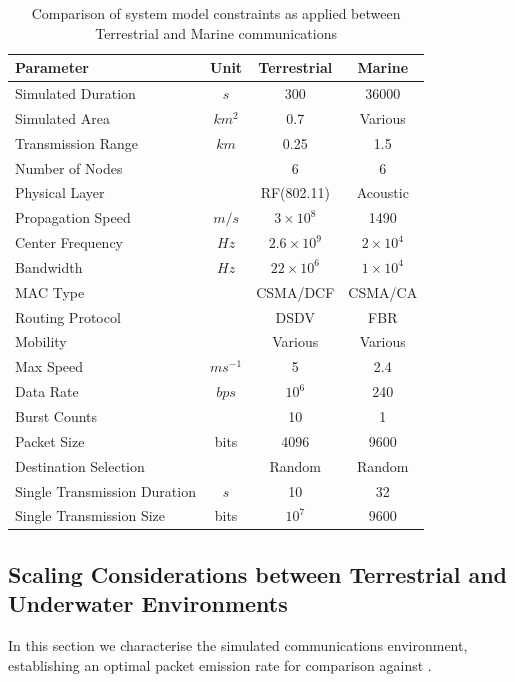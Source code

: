 \documentclass[runningheads,a4paper]{llncs}
\begin{document}
\begin{table}[H]
  \caption{Comparison of system model constraints as applied between Terrestrial and Marine communications} \label{tab:sysconstraints}
  \begin{center}
    \setlength{\tabcolsep}{8pt}
    \begin{tabular}{lccc}
      \toprule
      Parameter & Unit & Terrestrial & Marine \\
      \midrule
      Simulated Duration & $s$ & 300 & 36000\\
      Simulated Area & $km^2$ & 0.7 & Various \\
      Transmission Range & $km$ & 0.25 & 1.5 \\
      Number of Nodes & & 6 & 6 \\
      Physical Layer & & RF(802.11) & Acoustic\\
      Propagation Speed& $m/s$ & $3\times10^8$ & 1490\\
      Center Frequency& $Hz$ & $2.6\times10^9$ & $2 \times 10^4$ \\
      Bandwidth& $Hz$ & $22\times10^6$ & $1\times10^4$\\
      MAC Type & & CSMA/DCF & CSMA/CA\\
      Routing Protocol & & DSDV & FBR \\
      Mobility & & Various & Various \\
      Max Speed & $ms^{-1}$ & 5 & 2.4 \\
      Data Rate & $bps$ & $10^6$ & 240 \\
      Burst Counts & & 10 & 1 \\
      Packet Size & bits & 4096 &  9600 \\
      Destination Selection & & Random & Random\\
      Single Transmission Duration & $s$ & 10 & 32 \\
      Single Transmission Size & bits & $10^7$ & $9600$ \\
      \bottomrule
    \end{tabular}
    \setlength{\tabcolsep}{6pt}
  \end{center}
\end{table}


\subsection{Scaling Considerations between Terrestrial and Underwater Environments}

In this section we characterise the simulated communications environment, establishing an optimal packet emission rate for comparison against \cite{Guo11}.
\end{document}

